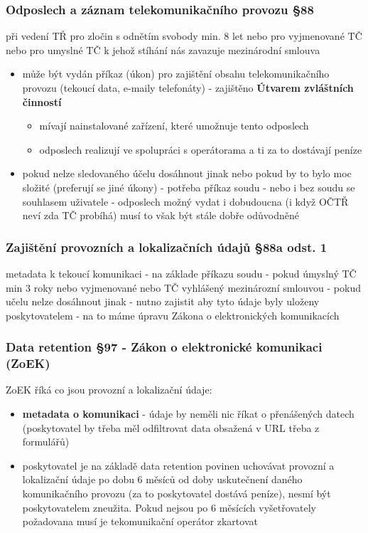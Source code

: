\subsubsection*{Odposlech a záznam telekomunikačního provozu §88}
při vedení TŘ pro zločin s odnětím svobody min. 8 let nebo pro vyjmenované TČ nebo pro
umyslné TČ k jehož stíhání nás zavazuje mezinárodní smlouva
\begin{itemize}
    \item může být vydán příkaz (úkon) pro zajištění obsahu telekomunikačního provozu (tekoucí data, e-maily telefonáty) - zajištěno \textbf{Útvarem zvláštních činností}
    \begin{itemize}
        \item mívají nainstalované zařízení, které umožnuje tento odposlech
        \item odposlech realizují ve spolupráci s operátorama a ti za to dostávají peníze
    \end{itemize}
    \item pokud nelze sledovaného účelu dosáhnout jinak nebo pokud by to bylo moc složité (preferují se
jiné úkony) - potřeba příkaz soudu - nebo i bez soudu se souhlasem uživatele - odposlech možný
vydat i dobudoucna (i když OČTŘ neví zda TČ probíhá) musí to však být stále dobře odůvodněné
\end{itemize}

\subsubsection*{Zajištění provozních a lokalizačních údajů §88a odst. 1}
metadata k tekoucí komunikaci - na základe příkazu soudu - pokud úmyslný TČ min 3 roky nebo
vyjmenované nebo TČ vyhlášený mezinározní smlouvou - pokud učelu nelze dosáhnout jinak -
nutno zajistit aby tyto údaje byly uloženy poskytovatelem - na to máme úpravu Zákona o
elektronických komunikacích

\subsubsection*{Data retention §97 - Zákon o elektronické komunikaci (ZoEK)}
ZoEK říká co jsou provozní a lokalizační údaje:
\begin{itemize}
    \item \textbf{metadata o komunikaci} - údaje by neměli nic říkat o přenášených datech (poskytovatel by třeba měl odfiltrovat data obsažená v URL třeba z formulářů)
    \item  poskytovatel je na základě data retention povinen uchovávat provozní a lokalizační údaje po dobu 6 měsíců od doby uskutečnení daného komunikačního provozu (za to poskytovatel dostává peníze), nesmí být poskytovatelem zneužita. Pokud nejsou po 6 měsících vyšetřovately požadovana musí je tekomunikační operátor zkartovat
\end{itemize}

